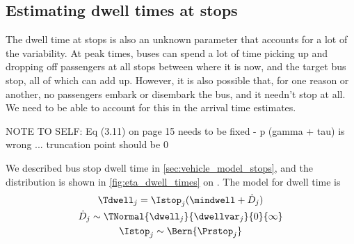 \subsection{Estimating dwell times at stops}
\label{sec:trip_state_dwell}


The dwell time at stops is also an unknown parameter
that accounts for a lot of the variability.
At peak times, buses can spend a lot of time picking up
and dropping off passengers at all stops between
where it is now, and the target bus stop,
all of which can add up.
However, it is also possible that,
for one reason or another,
no passengers embark or disembark the bus,
and it needn't stop at all.
We need to be able to account for this in the arrival time estimates.

NOTE TO SELF: Eq (3.11) on page 15 needs to be fixed - p (gamma + tau) is wrong ... truncation point should be 0

We described bus stop dwell time in \cref{sec:vehicle_model_stops},
and the distribution is shown in
\cref{fig:eta_dwell_times} on .
The model for dwell time is
\begin{gather}
\label{eq:stop_dwell_times}
\Tdwell_{j} = \Istop_{j} (\mindwell + \dot D_{j}) \\
\dot D_{j} \sim \TNormal{\dwell_{j}}{\dwellvar_{j}}{0}{\infty} \nonumber \\
\Istop_{j} \sim \Bern{\Prstop_{j}} \nonumber
\end{gather}

